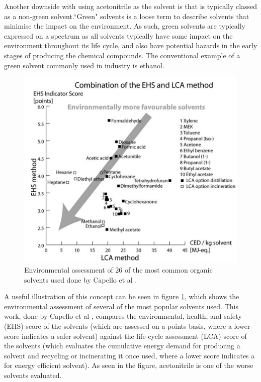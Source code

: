 Another downside with using acetonitrile as the solvent is that is typically classed as a non-green solvent.``Green" solvents is a loose term to describe solvents that minimise the impact on the environment. As such, green solvents are typically expressed on a spectrum as all solvents typically have some impact on the environment throughout its life cycle, and also have potential hazards in the early stages of producing the chemical compounds. The conventional example of a green solvent commonly used in industry is ethanol.

\begin{figure}[h!]
	\centering
    \includegraphics[width=0.85\linewidth]{chapter_6/figures/green_solvent.png} 
	\caption{Environmental assessment of 26 of the most common organic solvents used done by Capello et al \cite{}.}
	\label{fig:green_solvent}
\end{figure} 

A useful illustration of this concept can be seen in figure \ref{fig:green_solvent}, which shows the environmental assessment of several of the most popular solvents used. This work, done by Capello et al \cite{Capello2007}, compares the environmental, health, and safety (EHS) score of the solvents (which are assessed on a points basis, where a lower score indicates a safer solvent) against the life-cycle assessment (LCA) score of the solvents (which evaluates the cumulative energy demand for producing a solvent and recycling or incinerating it once used, where a lower score indicates a for energy efficient solvent). As seen in the figure, acetonitrile is one of the worse solvents evaluated.

